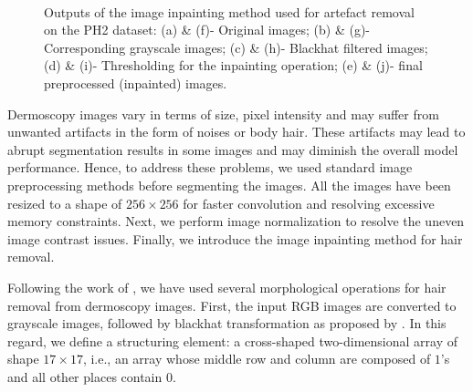 \documentclass[review]{elsarticle}
\begin{document}
\begin{figure*}
    \centering
    \\
    \caption{Outputs of the image inpainting method used for artefact removal on the PH2 dataset: (a) \& (f)- Original images; (b) \& (g)- Corresponding grayscale images; (c) \& (h)- Blackhat filtered images; (d) \& (i)- Thresholding for the inpainting operation; (e) \& (j)- final preprocessed (inpainted) images.}
    \label{inpaint}
\end{figure*}



Dermoscopy images vary in terms of size, pixel intensity and may suffer from unwanted artifacts in the form of noises or body hair. These artifacts may lead to abrupt segmentation results in some images and may diminish the overall model performance. Hence, to address these problems, we used standard image preprocessing methods before segmenting the images. All the images have been resized to a shape of $256\times 256$ for faster convolution and resolving excessive memory constraints. Next, we perform image normalization to resolve the uneven image contrast issues. Finally, we introduce the image inpainting method for hair removal.

Following the work of \cite{telea2004image}, we have used several morphological operations for hair removal from dermoscopy images. First, the input RGB images are converted to grayscale images, followed by blackhat transformation as proposed by \cite{wang2014morphological}. In this regard, we define a structuring element: a cross-shaped two-dimensional array of shape $17\times 17$, i.e., an array whose middle row and column are composed of $1$'s and all other places contain $0$. 
\end{document}
